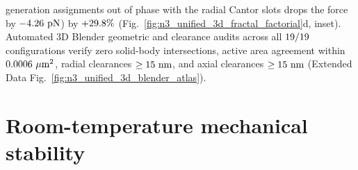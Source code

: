 \documentclass[pdflatex,sn-nature]{sn-jnl}
\DeclareRobustCommand{\roundone}[1]{\fpeval{round(#1,1)}}
\DeclareRobustCommand{\roundtwo}[1]{\fpeval{round(#1,2)}}
\DeclareRobustCommand{\roundfour}[1]{\fpeval{round(#1,4)}}
\begin{document}
generation assignments out of phase with the radial Cantor slots drops the force by $-\roundtwo{\NthreeUnithreedGainFoneoneoneVsOutphaseonetwoPn}\text{ pN}$) by $+\roundone{\NthreeUnithreedGainFoneoneoneVsOutphaseonetwoPct}\%$ (Fig.~\ref{fig:n3_unified_3d_fractal_factorial}d, inset). Automated 3D Blender geometric and clearance audits across all $19{}/19{}$ configurations verify zero solid-body intersections, active area agreement within $\roundfour{\NthreeBlenderAuditMaxAreaErrUmtwo}\ \mu\text{m}^2$, radial clearances $\ge 15{}\text{ nm}$, and axial clearances $\ge 15{}\text{ nm}$ (Extended Data Fig.~\ref{fig:n3_unified_3d_blender_atlas}).

\section*{Room-temperature mechanical stability}
\label{sec:experimental}
\end{document}
